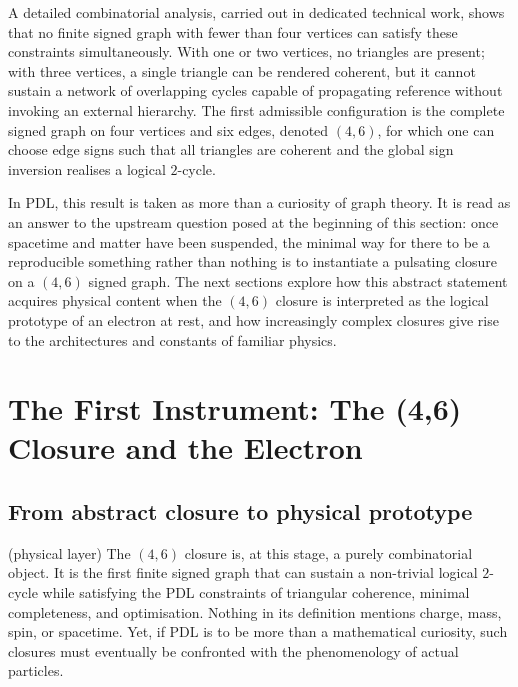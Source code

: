\documentclass[11pt,a4paper]{article}
\theoremstyle{definition}
\begin{document}
A detailed combinatorial analysis, carried out in dedicated technical work, shows that no finite signed graph with fewer than four vertices can satisfy these constraints simultaneously.\cite{Laubscher_MinimalClosures_46_2024} With one or two vertices, no triangles are present; with three vertices, a single triangle can be rendered coherent, but it cannot sustain a network of overlapping cycles capable of propagating reference without invoking an external hierarchy. The first admissible configuration is the complete signed graph on four vertices and six edges, denoted \((4,6)\), for which one can choose edge signs such that all triangles are coherent and the global sign inversion realises a logical \(2\)-cycle.\cite{Laubscher_MinimalClosures_46_2024,Laubscher_EmergencePhysicalReality_2024}

In PDL, this result is taken as more than a curiosity of graph theory. It is read as an answer to the upstream question posed at the beginning of this section: once spacetime and matter have been suspended, the minimal way for there to be a reproducible something rather than nothing is to instantiate a pulsating closure on a \((4,6)\) signed graph. The next sections explore how this abstract statement acquires physical content when the \((4,6)\) closure is interpreted as the logical prototype of an electron at rest, and how increasingly complex closures give rise to the architectures and constants of familiar physics.\cite{Laubscher_EmergencePhysicalReality_2024,Laubscher_Alpha_v2_2024,Laubscher_ProtonArch_v2_2024}

\section{The First Instrument: The (4,6) Closure and the Electron}
\label{sec:46_electron}

\subsection{From abstract closure to physical prototype}

(physical layer) The \((4,6)\) closure is, at this stage, a purely combinatorial object. It is the first finite signed graph that can sustain a non-trivial logical $2$-cycle while satisfying the PDL constraints of triangular coherence, minimal completeness, and optimisation. Nothing in its definition mentions charge, mass, spin, or spacetime. Yet, if PDL is to be more than a mathematical curiosity, such closures must eventually be confronted with the phenomenology of actual particles.
\end{document}
